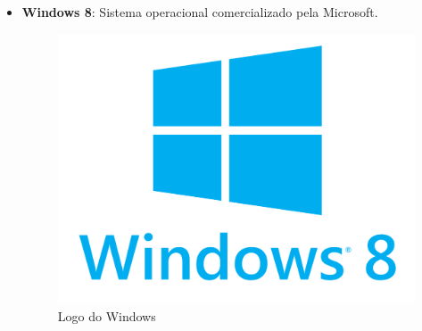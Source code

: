 \documentclass[11pt]{article} %
\begin{document}
\begin{itemize}
\item \textbf{Windows 8}: Sistema operacional comercializado pela Microsoft.

\begin{figure}[!htp]
\centering
\includegraphics[scale=0.05]{res/windows.png}
\caption{Logo do Windows}
\label{Logo do Windows}
\end{figure}

\end{itemize}
\end{document}
